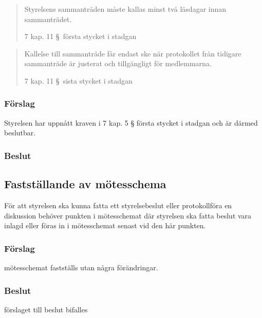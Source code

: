 \documentclass[protokoll]{dvd}
\begin{document}
\blockquote[7 kap. 11 \S~första stycket i stadgan]{
Styrelsens sammanträden måste kallas minst två läsdagar innan sammanträdet. }

\blockquote[7 kap. 11 \S~sista stycket i stadgan]{
Kallelse till sammanträde får endast ske när protokollet från tidigare sammanträde är justerat och tillgängligt för medlemmarna.}

\subsubsection*{Förslag}

\begin{attsatser}
    \item Styrelsen har uppnått kraven i 7 kap. 5 § första stycket i stadgan och är därmed beslutbar.
\end{attsatser}
\subsubsection*{Beslut}
\begin{attsatser}
    \item %
\end{attsatser}


\subsection{Fastställande av mötesschema}

För att styrelsen ska kunna fatta ett styrelsebeslut eller protokollföra en diskussion behöver punkten i mötesschemat där styrelsen ska fatta beslut vara inlagd eller föras in i mötesschemat senast vid den här punkten.

\subsubsection*{Förslag}

\begin{attsatser}
    \item 
    mötesschemat fastställs utan några förändringar.
\end{attsatser}
\subsubsection*{Beslut}
\begin{attsatser}
    \item förslaget till beslut bifalles
\end{attsatser}
\end{document}
